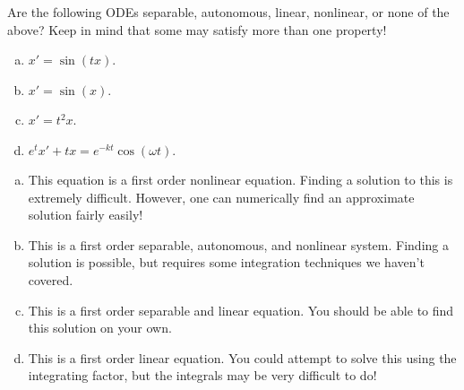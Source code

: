 \documentclass[12pt]{article} %
\begin{document}
\newpage

\begin{problem}
Are the following ODEs separable, autonomous, linear, nonlinear, or none of the above? Keep in mind that some may satisfy more than one property!
    \begin{enumerate}[(a)]
        \item $x' = \sin(tx)$.
        \item $x' = \sin(x)$.
        \item $x' = t^2 x$.
        \item $e^t x' + tx = e^{-k t} \cos(\omega t).$
    \end{enumerate}
\end{problem}
\begin{solution}
    \begin{enumerate}[(a)]
        \item This equation is a first order nonlinear equation. Finding a solution to this is extremely difficult.  However, one can numerically find an approximate solution fairly easily!
        \item This is a first order separable, autonomous, and nonlinear system. Finding a solution is possible, but requires some integration techniques we haven't covered.
        \item This is a first order separable and linear equation.  You should be able to find this solution on your own.
        \item This is a first order linear equation. You could attempt to solve this using the integrating factor, but the integrals may be very difficult to do!
    \end{enumerate}
\end{solution}

\newpage
\end{document}
